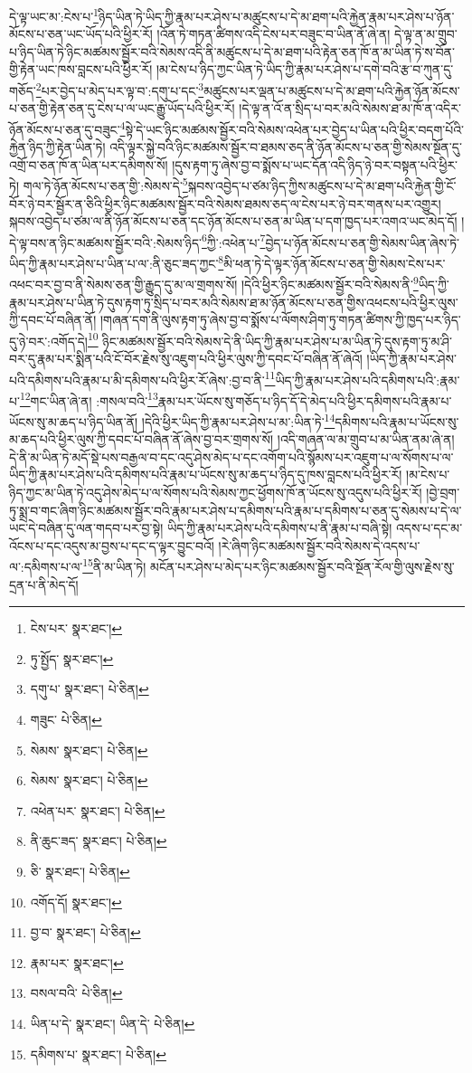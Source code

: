 དེ་ལྟ་ཡང་མ་:ངེས་པ་\footnote{ངེས་པར་  སྣར་ཐང་། }ཉིད་ཡིན་ཏེ་ཡིད་ཀྱི་རྣམ་པར་ཤེས་པ་མཚུངས་པ་དེ་མ་ཐག་པའི་རྐྱེན་རྣམ་པར་ཤེས་པ་ཉོན་མོངས་པ་ཅན་ཡང་ཡོད་པའི་ཕྱིར་རོ། །འོན་ཏེ་གཏན་ཚིགས་འདི་ངེས་པར་བཟུང་བ་ཡིན་ནོ་ཞེ་ན། དེ་ལྟ་ན་མ་གྲུབ་པ་ཉིད་ཡིན་ཏེ་ཉིང་མཚམས་སྦྱོར་བའི་སེམས་འདི་ནི་མཚུངས་པ་དེ་མ་ཐག་པའི་རྟེན་ཅན་ཁོ་ན་མ་ཡིན་ཏེ་ས་བོན་གྱི་རྟེན་ཡང་ཁས་བླངས་པའི་ཕྱིར་རོ། །མ་ངེས་པ་ཉིད་ཀྱང་ཡིན་ཏེ་ཡིད་ཀྱི་རྣམ་པར་ཤེས་པ་དགེ་བའི་རྩ་བ་ཀུན་དུ་གཅོད་\footnote{ཏུ་སྤྱོད་  སྣར་ཐང་། }པར་བྱེད་པ་མེད་པར་ལྟ་བ་:དགུ་པ་དང་\footnote{དགུ་པ་  སྣར་ཐང་།  པེ་ཅིན། }མཚུངས་པར་ལྡན་པ་མཚུངས་པ་དེ་མ་ཐག་པའི་རྐྱེན་ཉོན་མོངས་པ་ཅན་གྱི་རྟེན་ཅན་དུ་ངེས་པ་ལ་ཡང་རྒྱུ་ཡོད་པའི་ཕྱིར་རོ། །དེ་ལྟ་ན་འོ་ན་སྲིད་པ་བར་མའི་སེམས་ཐ་མ་ཁོ་ན་འདིར་ཉོན་མོངས་པ་ཅན་དུ་བཟུང་\footnote{གཟུང་  པེ་ཅིན། }སྟེ་དེ་ཡང་ཉིང་མཚམས་སྦྱོར་བའི་སེམས་འཕེན་པར་བྱེད་པ་ཡིན་པའི་ཕྱིར་བདག་པོའི་རྐྱེན་ཉིད་ཀྱི་རྟེན་ཡིན་ཏེ། འདི་ལྟར་སྐྱེ་བའི་ཉིང་མཚམས་སྦྱོར་བ་ཐམས་ཅད་ནི་ཉོན་མོངས་པ་ཅན་གྱི་སེམས་སྔོན་དུ་འགྲོ་བ་ཅན་ཁོ་ན་ཡིན་པར་དམིགས་སོ། །དུས་རྟག་ཏུ་ཞེས་བྱ་བ་སྨོས་པ་ཡང་དོན་འདི་ཉིད་ཉེ་བར་བསྟན་པའི་ཕྱིར་ཏེ། གལ་ཏེ་ཉོན་མོངས་པ་ཅན་གྱི་:སེམས་དེ་\footnote{སེམས་  སྣར་ཐང་།  པེ་ཅིན། }སྐབས་འབྱེད་པ་ཙམ་ཉིད་ཀྱིས་མཚུངས་པ་དེ་མ་ཐག་པའི་རྐྱེན་གྱི་ངོ་བོར་ཉེ་བར་སྦྱོར་ན་ཅིའི་ཕྱིར་ཉིང་མཚམས་སྦྱོར་བའི་སེམས་ཐམས་ཅད་ལ་ངེས་པར་ཉེ་བར་གནས་པར་འགྱུར། སྐབས་འབྱེད་པ་ཙམ་ལ་ནི་ཉོན་མོངས་པ་ཅན་དང་ཉོན་མོངས་པ་ཅན་མ་ཡིན་པ་དག་ཁྱད་པར་འགའ་ཡང་མེད་དོ། །དེ་ལྟ་བས་ན་ཉིང་མཚམས་སྦྱོར་བའི་:སེམས་ཉིད་\footnote{སེམས་  སྣར་ཐང་།  པེ་ཅིན། }ཀྱི་:འཕེན་པ་\footnote{འཕེན་པར་  སྣར་ཐང་།  པེ་ཅིན། }བྱེད་པ་ཉོན་མོངས་པ་ཅན་གྱི་སེམས་ཡིན་ཞེས་ཏེ་ཡིད་ཀྱི་རྣམ་པར་ཤེས་པ་ཡིན་པ་ལ་:ནི་ཅུང་ཟད་ཀྱང་\footnote{ནི་ཆུང་ཟད་  སྣར་ཐང་།  པེ་ཅིན། }མི་ཕན་ཏེ་དེ་ལྟར་ཉོན་མོངས་པ་ཅན་གྱི་སེམས་ངེས་པར་འཕང་བར་བྱ་བ་ནི་སེམས་ཅན་གྱི་རྒྱུད་དུ་མ་ལ་གྲགས་སོ། །དེའི་ཕྱིར་ཉིང་མཚམས་སྦྱོར་བའི་སེམས་ནི་\footnote{ཅི་  སྣར་ཐང་།  པེ་ཅིན། }ཡིད་ཀྱི་རྣམ་པར་ཤེས་པ་ཡིན་ཏེ་དུས་རྟག་ཏུ་སྲིད་པ་བར་མའི་སེམས་ཐ་མ་ཉོན་མོངས་པ་ཅན་གྱིས་འཕངས་པའི་ཕྱིར་ལུས་ཀྱི་དབང་པོ་བཞིན་ནོ། །གཞན་དག་ནི་ལུས་རྟག་ཏུ་ཞེས་བྱ་བ་སྨོས་པ་ལོགས་ཤིག་ཏུ་གཏན་ཚིགས་ཀྱི་ཁྱད་པར་ཉིད་དུ་ཉེ་བར་:འགོད་དེ།\footnote{འགོད་དོ།  སྣར་ཐང་། } ཉིང་མཚམས་སྦྱོར་བའི་སེམས་དེ་ནི་ཡིད་ཀྱི་རྣམ་པར་ཤེས་པ་མ་ཡིན་ཏེ་དུས་རྟག་ཏུ་མ་ཤི་བར་དུ་རྣམ་པར་སྨིན་པའི་ངོ་བོར་རྗེས་སུ་འཇུག་པའི་ཕྱིར་ལུས་ཀྱི་དབང་པོ་བཞིན་ནོ་ཞེའོ། །ཡིད་ཀྱི་རྣམ་པར་ཤེས་པའི་དམིགས་པའི་རྣམ་པ་མི་དམིགས་པའི་ཕྱིར་རོ་ཞེས་:བྱ་བ་ནི་\footnote{བྱ་བ་  སྣར་ཐང་།  པེ་ཅིན། }ཡིད་ཀྱི་རྣམ་པར་ཤེས་པའི་དམིགས་པའི་:རྣམ་པ་\footnote{རྣམ་པར་  སྣར་ཐང་། }གང་ཡིན་ཞེ་ན། :གསལ་བའི་\footnote{བསལ་བའི་  པེ་ཅིན། }རྣམ་པར་ཡོངས་སུ་གཅོད་པ་ཉིད་དོ་དེ་མེད་པའི་ཕྱིར་དམིགས་པའི་རྣམ་པ་ཡོངས་སུ་མ་ཆད་པ་ཉིད་ཡིན་ནོ། །དེའི་ཕྱིར་ཡིད་ཀྱི་རྣམ་པར་ཤེས་པ་མ་:ཡིན་ཏེ་\footnote{ཡིན་པ་དེ་  སྣར་ཐང་། ཡིན་དེ་  པེ་ཅིན། }དམིགས་པའི་རྣམ་པ་ཡོངས་སུ་མ་ཆད་པའི་ཕྱིར་ལུས་ཀྱི་དབང་པོ་བཞིན་ནོ་ཞེས་བྱ་བར་གྲགས་སོ། །འདི་གཞན་ལ་མ་གྲུབ་པ་མ་ཡིན་ནམ་ཞེ་ན། དེ་ནི་མ་ཡིན་ཏེ་མདོ་སྡེ་པས་བརྒྱལ་བ་དང་འདུ་ཤེས་མེད་པ་དང་འགོག་པའི་སྙོམས་པར་འཇུག་པ་ལ་སོགས་པ་ལ་ཡིད་ཀྱི་རྣམ་པར་ཤེས་པའི་དམིགས་པའི་རྣམ་པ་ཡོངས་སུ་མ་ཆད་པ་ཉིད་དུ་ཁས་བླངས་པའི་ཕྱིར་རོ། །མ་ངེས་པ་ཉིད་ཀྱང་མ་ཡིན་ཏེ་འདུ་ཤེས་མེད་པ་ལ་སོགས་པའི་སེམས་ཀྱང་ཕྱོགས་ཁོ་ན་ཡོངས་སུ་འདུས་པའི་ཕྱིར་རོ། །བྱེ་བྲག་ཏུ་སྨྲ་བ་གང་ཞིག་ཉིང་མཚམས་སྦྱོར་བའི་རྣམ་པར་ཤེས་པ་དམིགས་པའི་རྣམ་པ་དམིགས་པ་ཅན་དུ་སེམས་པ་དེ་ལ་ཡང་དེ་བཞིན་དུ་ལན་གདབ་པར་བྱ་སྟེ། ཡིད་ཀྱི་རྣམ་པར་ཤེས་པའི་དམིགས་པ་ནི་རྣམ་པ་བཞི་སྟེ། འདས་པ་དང་མ་འོངས་པ་དང་འདུས་མ་བྱས་པ་དང་ད་ལྟར་བྱུང་བའོ། །རེ་ཞིག་ཉིང་མཚམས་སྦྱོར་བའི་སེམས་དེ་འདས་པ་ལ་:དམིགས་པ་ལ་\footnote{དམིགས་པ་  སྣར་ཐང་།  པེ་ཅིན། }ནི་མ་ཡིན་ཏེ། མངོན་པར་ཤེས་པ་མེད་པར་ཉིང་མཚམས་སྦྱོར་བའི་སྔོན་རོལ་གྱི་ལུས་རྗེས་སུ་དྲན་པ་ནི་མེད་དོ། 